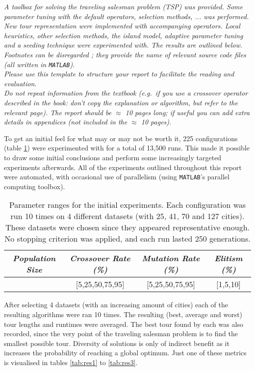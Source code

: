 
\begin{center}
\textit{A toolbox for solving the traveling salesman problem (TSP) was provided. Some parameter tuning with the default operators, selection methods, ... was performed. New tour representation were implemented with accompanying operators. Local heuristics, other selection methods, the island model, adaptive parameter tuning and a seeding technique were experimented with. The results are outlined below. Footnotes can be disregarded ; they provide the name of relevant source code files (all written in \texttt{MATLAB}).}\\
\textit{
Please use this template to structure your report to facilitate the reading and evaluation.\\
Do not repeat information from the textbook (e.g.\ if you use a crossover operator described in the book: don't copy the explanation or algorithm, but refer to the relevant page).
The report should be $\approx$ 10 pages long; if useful you can add extra details in appendices (not included in the $\approx$ 10 pages).
}
\end{center}


To get an initial feel for what may or may not be worth it, 225 configurations (table \ref{tab:par1}) were experimented with for a total of 13,500 runs. This made it possible to draw some initial conclusions and perform some increasingly targeted experiments afterwards. All of the experiments outlined throughout this report were automated, with occasional use of parallelism (using \texttt{MATLAB}'s parallel computing toolbox).

\begin{table}[h]
\centering
\begin{tabular}{c|c|c|c}
\textit{Population Size} & \textit{Crossover Rate (\%)} & \textit{Mutation Rate (\%)} & \textit{Elitism (\%)} \\\hline 
[150,300,1000] & [5,25,50,75,95] & [5,25,50,75,95] & [1,5,10]
\end{tabular}
\caption{Parameter ranges for the initial experiments. Each configuration was run 10 times on 4 different datasets (with 25, 41, 70 and 127 cities). These datasets were chosen since they appeared representative enough. No stopping criterion was applied, and each run lasted 250 generations. }
\label{tab:par1}
\end{table}

\noindent After selecting 4 datasets (with an increasing amount of cities) each of the resulting algorithms were ran 10 times. The resulting (best, average and worst) tour lengths and runtimes were averaged. The best tour found by each was also recorded, since the very point of the traveling salesman problem is to find the smallest possible tour. Diversity of solutions is only of indirect benefit as it increases the probability of reaching a global optimum. Just one of these metrics is visualised in tables \ref{tab:res1} to \ref{tab:res3}.\\


